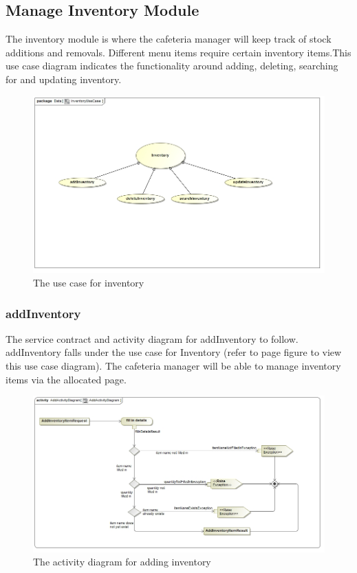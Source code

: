 \documentclass[a4paper,12pt]{report}
\begin{document}
\subsection{Manage Inventory Module}

The inventory module is where the cafeteria manager will keep track of stock additions and removals. Different menu items require certain inventory items.This use case diagram indicates the functionality around adding, deleting, searching for and updating inventory.

\begin{figure}[H]
  \centering
    \includegraphics[width=1.0\textwidth]{../images/InventoryUseCase.jpg}
    \caption{The use case for inventory} 
\end{figure}

\subsubsection{addInventory}
The service contract and activity diagram for addInventory to follow. addInventory falls under the use case for Inventory (refer to page   figure   to view this use case diagram). The cafeteria manager will be able to manage inventory items via the allocated page.
\begin{figure}[H]
  \centering
    \includegraphics[width=1.0\textwidth]{../images/AddActivityDiagram.jpg}
    \caption{The activity diagram for adding inventory} 
\end{figure}
\end{document}
